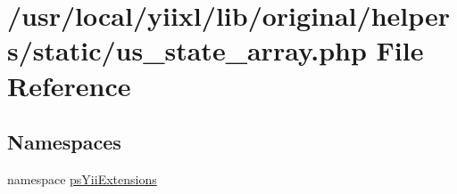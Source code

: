 \hypertarget{us__state__array_8php}{
\section{/usr/local/yiixl/lib/original/helpers/static/us\_\-state\_\-array.php File Reference}
\label{us__state__array_8php}
}
\subsection*{Namespaces}
\begin{DoxyCompactItemize}
\item 
namespace \hyperlink{namespacepsYiiExtensions}{psYiiExtensions}
\end{DoxyCompactItemize}
